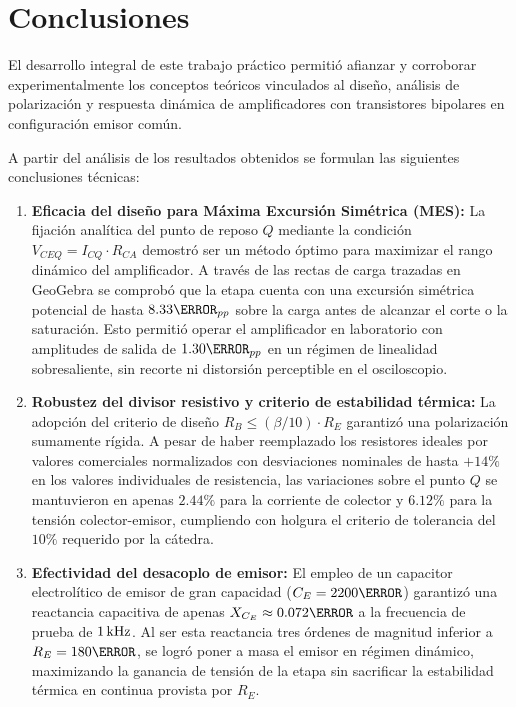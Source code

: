 \chapter{Conclusiones}
\label{chap:conclusiones}

El desarrollo integral de este trabajo práctico permitió afianzar y corroborar experimentalmente los conceptos
teóricos vinculados al diseño, análisis de polarización y respuesta dinámica de amplificadores con transistores
bipolares en configuración emisor común.

A partir del análisis de los resultados obtenidos se formulan las siguientes conclusiones técnicas:
\begin{enumerate}
  \item \textbf{Eficacia del diseño para Máxima Excursión Simétrica (MES):}
    La fijación analítica del punto de reposo $Q$ mediante la condición $V_{CEQ} = I_{CQ} \cdot R_{CA}$ demostró ser un
    método óptimo para maximizar el rango dinámico del amplificador. A través de las rectas de carga trazadas en
    GeoGebra se comprobó que la etapa cuenta con una excursión simétrica potencial de hasta $8.33\V_{pp}$ sobre la carga
    antes de alcanzar el corte o la saturación. Esto permitió operar el amplificador en laboratorio con amplitudes de
    salida de $1.30\V_{pp}$ en un régimen de linealidad sobresaliente, sin recorte ni distorsión perceptible en el
    osciloscopio.

  \item \textbf{Robustez del divisor resistivo y criterio de estabilidad térmica:}
    La adopción del criterio de diseño $R_B \le (\beta / 10) \cdot R_E$ garantizó una polarización sumamente rígida. A
    pesar de haber reemplazado los resistores ideales por valores comerciales normalizados con desviaciones nominales de
    hasta $+14\%$ en los valores individuales de resistencia, las variaciones sobre el punto $Q$ se mantuvieron en
    apenas $2.44\%$ para la corriente de colector y $6.12\%$ para la tensión colector-emisor, cumpliendo con holgura el
    criterio de tolerancia del $10\%$ requerido por la cátedra.

  \item \textbf{Efectividad del desacoplo de emisor:}
    El empleo de un capacitor electrolítico de emisor de gran capacidad ($C_E = 2200\uF$) garantizó una reactancia
    capacitiva de apenas $X_{C_E} \approx 0.072\ohm$ a la frecuencia de prueba de $1\,\mathrm{kHz}$. Al ser esta reactancia tres
    órdenes de magnitud inferior a $R_E = 180\ohm$, se logró poner a masa el emisor en régimen dinámico, maximizando la
    ganancia de tensión de la etapa sin sacrificar la estabilidad térmica en continua provista por $R_E$.


\end{enumerate}
